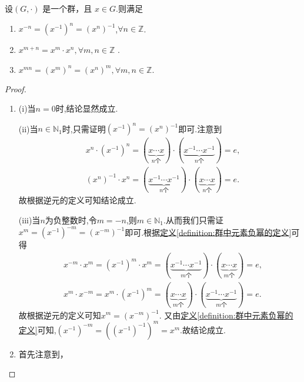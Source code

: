 \documentclass[../../main.tex]{subfiles}
\begin{document}
\begin{proposition}\label{proposition:关于元素幂的一些性质}
设$(G,\cdot)$ 是一个群，且 $x\in G$.则满足
\begin{enumerate}[(1)]
\item $x^{-n}=(x^{-1})^n=(x^n)^{-1}$,$\forall n\in\mathbb{Z}$.

\item $x^{m+n}=x^m\cdot x^n,\forall m,n\in \mathbb{Z}$ .

\item $x^{mn}=\left( x^m \right) ^n=\left( x^n \right) ^m,\forall m,n\in \mathbb{Z} .$
\end{enumerate}
\end{proposition}
\begin{proof}
\begin{enumerate}[(1)]
\item (i)当$n=0$时,结论显然成立.

(ii)当$n\in \mathbb{N}_1$时,只需证明$(x^{-1})^n=(x^n)^{-1}$即可.注意到
\begin{align*}
&x^n\cdot (x^{-1})^n=\left( \underset{n\text{个}}{\underbrace{x\cdots x}} \right) \cdot \left( \underset{n\text{个}}{\underbrace{x^{-1}\cdots x^{-1}}} \right) =e,
\\
&(x^n)^{-1}\cdot x^n=\left( \underset{n\text{个}}{\underbrace{x^{-1}\cdots x^{-1}}} \right) \cdot \left( \underset{n\text{个}}{\underbrace{x\cdots x}} \right) =e.
\end{align*}
故根据逆元的定义可知结论成立.

(iii)当$n$为负整数时,令$m=-n$,则$m\in \mathbb{N}_1$.从而我们只需证$x^m=(x^{-1})^{-m}=(x^{-m})^{-1}$即可.根据\hyperref[definition:群中元素负幂的定义]{定义\ref{definition:群中元素负幂的定义}}可得
\begin{align*}
&x^{-m}\cdot x^m=\left( x^{-1} \right) ^m\cdot x^m=\left( \underset{m\text{个}}{\underbrace{x^{-1}\cdots x^{-1}}} \right) \cdot \left( \underset{m\text{个}}{\underbrace{x\cdots x}} \right) =e,
\\
&x^m\cdot x^{-m}=x^m\cdot \left( x^{-1} \right) ^m=\left( \underset{m\text{个}}{\underbrace{x\cdots x}} \right) \cdot \left( \underset{m\text{个}}{\underbrace{x^{-1}\cdots x^{-1}}} \right) =e.
\end{align*}
故根据逆元的定义可知$x^m=\left( x^{-m} \right) ^{-1}$.
又由\hyperref[definition:群中元素负幂的定义]{定义\ref{definition:群中元素负幂的定义}}可知,$\left( x^{-1} \right) ^{-m}=\left( \left( x^{-1} \right) ^{-1} \right) ^m=x^m$.故结论成立.

\item 首先注意到，


\end{enumerate}
\end{proof}
\end{document}
